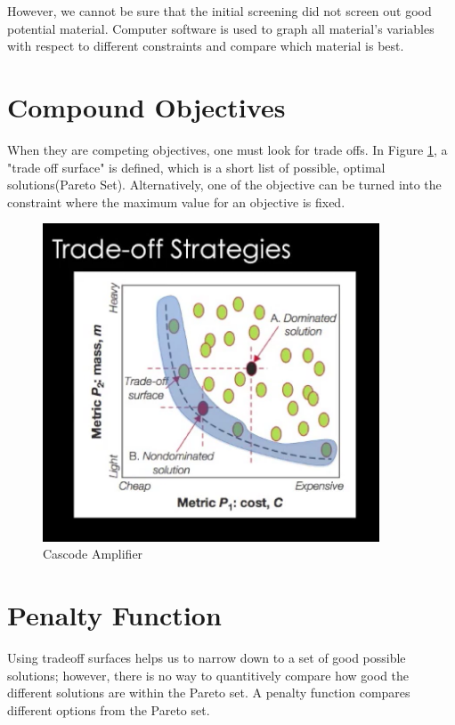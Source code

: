 \documentclass{article}
\begin{document}
    However, we cannot be sure that the initial screening did not screen out good potential material.
    Computer software is used to graph all material's variables with respect to different constraints and compare 
    which material is best.
    
        \section*{Compound Objectives}
        When they are competing objectives, one must look for trade offs. 
        In Figure \ref{fig:trade_off_graph}, a "trade off surface" is defined, which is a short list of 
        possible, optimal solutions(Pareto Set). Alternatively, one of the objective can be turned into the constraint where 
        the maximum value for an objective is fixed.

        \begin{figure}[H]
            \centering
            \includegraphics[width=10cm]{figures/trade_off_graph.PNG}
            \caption{Cascode Amplifier}
            \label{fig:trade_off_graph}
        \end{figure}
        
        \section*{Penalty Function}
        Using tradeoff surfaces helps us to narrow down to a set of good possible 
        solutions; however, there is no way to quantitively compare how good the different 
        solutions are within the Pareto set. A penalty function compares different options from the 
        Pareto set.\par
\end{document}

